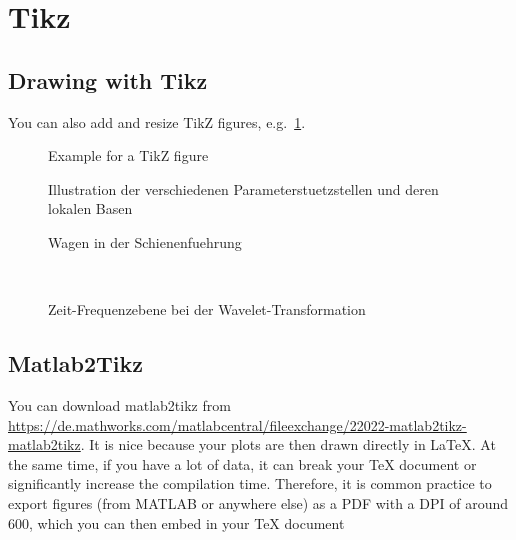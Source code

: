 \section{Tikz}

\subsection{Drawing with Tikz}

You can also add and resize TikZ figures, e.g.\ \cref{fig:tikzExample}.

\begin{figure}[p]
	\centering
	\resizebox{0.4\linewidth}{!}{}
	\caption{Example for a TikZ figure}
	\label{fig:tikzExample}
\end{figure}

\begin{figure}[ht]
	\centering
	
	\caption{Illustration der verschiedenen Parameterstuetzstellen und deren lokalen Basen}
	\label{fig:ableitung_V}
\end{figure} 

\begin{figure}[hbp]
	\centering
	
	\caption{Wagen in der Schienenfuehrung}
	\label{fig:aufbau:wagen}
\end{figure}

\begin{figure}
	\centering
	\begin{minipage}[c]{\textwidth}
		\centering
		
		\caption{Zeit-Skalierungsebene bei der Wavelet-Transformation}
		\label{fig:cwt_a}
	\end{minipage}\\[1em]
	\begin{minipage}[c]{\textwidth}
		\centering
		
		\caption{Zeit-Frequenzebene bei der Wavelet-Transformation}
		\label{fig:cwt_f}
	\end{minipage}
\end{figure}

\subsection{Matlab2Tikz}
You can download matlab2tikz from \url{https://de.mathworks.com/matlabcentral/fileexchange/22022-matlab2tikz-matlab2tikz}. It is nice because your plots are then drawn directly in \LaTeX{}. At the same time, if you have a lot of data, it can break your \TeX{} document or significantly increase the compilation time. Therefore, it is common practice to export figures (from MATLAB or anywhere else) as a PDF with a DPI of around 600, which you can then embed in your \TeX{} document

